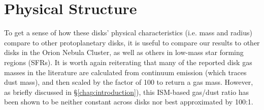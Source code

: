\section{Physical Structure}





To get a sense of how these disks' physical characteristics (i.e. mass and radius) compare to other protoplanetary disks, it is useful to compare our results to other disks in the Orion Nebula Cluster, as well as others in low-mass star forming regions (SFRs). It is worth again reiterating that many of the reported disk gas masses in the literature \citep[as well as the one we use here from ][]{Williams2014} are calculated from continuum emission (which traces dust mass), and then scaled by the factor of 100 to return a gas mass. However, as briefly discussed in \S\ref{chap:introduction}), this ISM-based gas/dust ratio has been shown to be neither constant across disks nor best approximated by 100:1.


